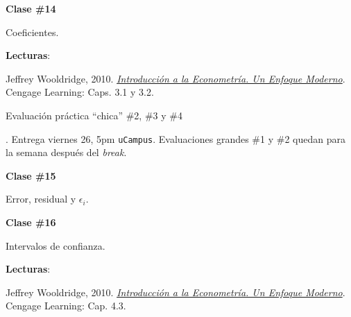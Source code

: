 \documentclass[letterpaper]{article}
\renewenvironment{itemize}{
  \begin{list}{}{
    \setlength{\leftmargin}{1.5em}
  }
}{
  \end{list}
}
\begin{document}
\begin{enumerate}
			\begin{itemize} 
				\item[$\bullet$] {\bf Clase \#14}
					\begin{itemize} 
						\item[$\circ$] Coeficientes. %
						\item[$\circ$] {\bf Lecturas}: 
							\begin{itemize}
								\item[$\diamond$] Jeffrey Wooldridge, 2010. \href{https://github.com/hbahamonde/Metodos_Cuanti_I/raw/master/Readings/Wooldridge.pdf}{\emph{Introducci\'on a la Econometr\'ia. Un Enfoque Moderno}}. Cengage Learning: Caps. 3.1 y 3.2.
							\end{itemize}
					\end{itemize}
			\end{itemize}


{\color{red}\item[\Pointinghand] Evaluaci\'on pr\'actica ``chica'' \#2, \#3 y \#4}. Entrega viernes 26, 5pm \texttt{uCampus}. Evaluaciones grandes \#1 y \#2 quedan para la semana despu\'es del \emph{break}.

			\begin{itemize} 
				\item[$\bullet$] {\bf Clase \#15}
					\begin{itemize} 
						\item[$\circ$] Error, residual y $\epsilon_{i}$.
					\end{itemize}
			\end{itemize}



			\begin{itemize} 
				\item[$\bullet$] {\bf Clase \#16}
					\begin{itemize} 
						\item[$\circ$] Intervalos de confianza. %
						\item[$\circ$] {\bf Lecturas}: 
							\begin{itemize}
								\item[$\diamond$] Jeffrey Wooldridge, 2010. \href{https://github.com/hbahamonde/Metodos_Cuanti_I/raw/master/Readings/Wooldridge.pdf}{\emph{Introducci\'on a la Econometr\'ia. Un Enfoque Moderno}}. Cengage Learning: Cap. 4.3.
							\end{itemize}
					\end{itemize}
			\end{itemize}




\end{enumerate}
\end{document}
